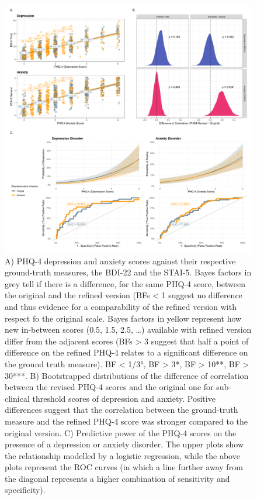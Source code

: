 \documentclass[
  jou,
  longtable,
  nolmodern,
  notxfonts,
  notimes,
  mask,
  colorlinks=true,linkcolor=blue,citecolor=blue,urlcolor=blue]{apa7}
\begin{document}
\begin{figure}[!htbp]

{\caption{{A) PHQ-4 depression and anxiety scores against their
respective ground-truth measures, the BDI-22 and the STAI-5. Bayes
factors in grey tell if there is a difference, for the same PHQ-4 score,
between the original and the refined version (BFs \textless{} 1 suggest
no difference and thus evidence for a comparability of the refined
version with respect fo the original scale. Bayes factors in yellow
represent how new in-between scores (0.5, 1.5, 2.5, \ldots) available
with refined version differ from the adjacent scores (BFs \textgreater{}
3 suggest that half a point of difference on the refined PHQ-4 relates
to a significant difference on the ground truth measure). BF \textless{}
1/3°, BF \textgreater{} 3*, BF \textgreater{} 10**, BF \textgreater{}
30***. B) Bootstrapped distributions of the difference of correlation
between the revised PHQ-4 scores and the original one for sub-clinical
threshold scores of depression and anxiety. Positive differences suggest
that the correlation between the ground-truth measure and the refined
PHQ-4 score was stronger compared to the original version. C) Predictive
power of the PHQ-4 scores on the presence of a depression or anxiety
disorder. The upper plots show the relationship modelled by a logistic
regression, while the above plots represent the ROC curves (in which a
line further away from the diagonal represents a higher combination of
sensitivity and specificity).}{\label{fig-two}}}}

\includegraphics[width=1\linewidth,height=\textheight,keepaspectratio]{../../study2/analysis/2_analysis_files/figure-html/figure-1.png}

\end{figure}
\end{document}
